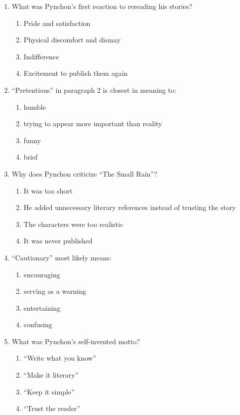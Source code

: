 \documentclass[10pt,a4paper]{article}
\begin{document}
\begin{enumerate}[label=\textbf{\arabic*.}, leftmargin=*]

\item What was Pynchon's first reaction to rereading his stories?
\begin{enumerate}[label=(\Alph*)]
\item Pride and satisfaction
\item Physical discomfort and dismay
\item Indifference
\item Excitement to publish them again
\end{enumerate}

\item ``Pretentious'' in paragraph 2 is closest in meaning to:
\begin{enumerate}[label=(\Alph*)]
\item humble \item trying to appear more important than reality
\item funny \item brief
\end{enumerate}

\item Why does Pynchon criticize ``The Small Rain''?
\begin{enumerate}[label=(\Alph*)]
\item It was too short
\item He added unnecessary literary references instead of trusting
the story
\item The characters were too realistic
\item It was never published
\end{enumerate}

\item ``Cautionary'' most likely means:
\begin{enumerate}[label=(\Alph*)]
\item encouraging \item serving as a warning
\item entertaining \item confusing
\end{enumerate}

\item What was Pynchon's self-invented motto?
\begin{enumerate}[label=(\Alph*)]
\item ``Write what you know''
\item ``Make it literary''
\item ``Keep it simple''
\item ``Trust the reader''
\end{enumerate}
\end{enumerate}
\end{document}
